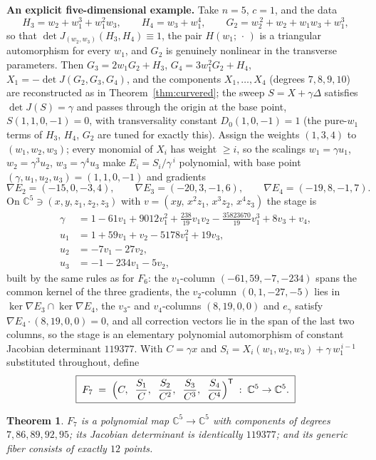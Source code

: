 \documentclass[11pt]{article}
\numberwithin{equation}{section}
\theoremstyle{plain}
\newtheorem{theorem}{Theorem}[section]
\theoremstyle{definition}
\theoremstyle{remark}
\newcommand{\C}{\mathbb{C}}
\begin{document}
\medskip\noindent\textbf{An explicit five-dimensional example.} Take $n=5$,
$c=1$, and the data
\[
H_3=w_2+w_1^3+w_1^2w_3,\qquad
H_4=w_3+w_1^4,\qquad
G_2=w_2^{\,2}+w_2+w_1w_3+w_1^3 ,
\]
so that $\det J_{(w_2,w_3)}(H_3,H_4)\equiv1$, the pair
$H(w_1;\,\cdot\,)$ is a triangular automorphism for every $w_1$, and $G_2$ is
genuinely nonlinear in the transverse parameters. Then $G_3=2w_1G_2+H_3$,
$G_4=3w_1^2G_2+H_4$, $X_1=-\det J(G_2,G_3,G_4)$, and the components
$X_1,\dots,X_4$ (degrees $7,8,9,10$) are reconstructed as in
Theorem~\ref{thm:curvered}; the sweep $S=X+\gamma\Delta$ satisfies
$\det J(S)=\gamma$ and passes through the origin at the base point,
$S(1,1,0,-1)=0$, with transversality constant $D_0(1,0,-1)=1$ (the pure-$w_1$
terms of $H_3$, $H_4$, $G_2$ are tuned for exactly this). Assign the weights
$(1,3,4)$ to $(w_1,w_2,w_3)$; every monomial of $X_i$ has weight $\ge i$, so
the scalings $w_1=\gamma u_1$, $w_2=\gamma^3u_2$, $w_3=\gamma^4u_3$ make
$E_i=S_i/\gamma^{\,i}$ polynomial, with base point
$(\gamma,u_1,u_2,u_3)=(1,1,0,-1)$ and gradients
\[
\nabla E_2=(-15,0,-3,4),\qquad
\nabla E_3=(-20,3,-1,6),\qquad
\nabla E_4=(-19,8,-1,7).
\]
On $\C^5\ni(x,y,z_1,z_2,z_3)$ with $v=(xy,\,x^2z_1,\,x^3z_2,\,x^4z_3)$ the
stage is
\[
\begin{aligned}
\gamma&=1-61v_1+9012v_1^2+\tfrac{238}{19}v_1v_2-\tfrac{35823670}{19}v_1^3+8v_3+v_4,\\
u_1&=1+59v_1+v_2-5178v_1^2+19v_3,\\
u_2&=-7v_1-27v_2,\\
u_3&=-1-234v_1-5v_2 ,
\end{aligned}
\]
built by the same rules as for $F_6$: the $v_1$-column $(-61,59,-7,-234)$
spans the common kernel of the three gradients, the $v_2$-column
$(0,1,-27,-5)$ lies in $\ker\nabla E_3\cap\ker\nabla E_4$, the $v_3$- and
$v_4$-columns $(8,19,0,0)$ and $e_\gamma$ satisfy $\nabla E_4\cdot(8,19,0,0)=0$,
and all correction vectors lie in the span of the last two columns, so the
stage is an elementary polynomial automorphism of constant Jacobian
determinant $119377$. With $C=\gamma x$ and
$S_i=X_i(w_1,w_2,w_3)+\gamma\,w_1^{\,i-1}$ substituted throughout, define
\[
\boxed{\;F_7\;=\;\Bigl(C,\;\;\frac{S_1}{C},\;\;\frac{S_2}{C^2},\;\;
\frac{S_3}{C^3},\;\;\frac{S_4}{C^4}\Bigr)^{\mathsf T}\;:\;\C^5\to\C^5 .\;}
\]

\begin{theorem}\label{thm:F7}
$F_7$ is a polynomial map $\C^5\to\C^5$ with components of degrees
$7,86,89,92,95$; its Jacobian determinant is identically $119377$; and its
generic fiber consists of exactly $12$ points.
\end{theorem}
\end{document}
